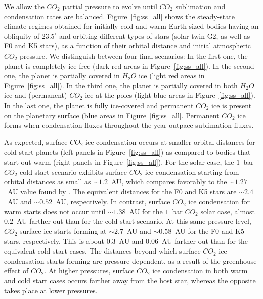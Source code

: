 \documentclass[fleqn,usenatbib]{mnras}
\begin{document}
We allow the $CO_{\mathrm{2}}$ partial pressure to evolve until $CO_{\mathrm{2}}$ sublimation and condensation rates are balanced. Figure~\ref{fig:ss_all} shows the steady-state climate regimes obtained for initially cold and warm Earth-sized bodies having an obliquity of $23.5^{\circ}$ and orbiting different types of stars (solar twin-G2, as well as F0 and K5 stars), as a function of their orbital distance and initial atmospheric $CO_{\mathrm{2}}$ pressure.  We distinguish between four final scenarios: In the first one, the planet is completely ice-free (dark red areas in Figure~\ref{fig:ss_all}). In the second one, the planet is partially covered in $H_{\mathrm{2}}O$ ice (light red areas in Figure~\ref{fig:ss_all}). In the third one, the planet is partially covered in both $H_{\mathrm{2}}O$ ice and (permanent) $CO_{\mathrm{2}}$ ice at the poles (light blue areas in Figure~\ref{fig:ss_all}). In the last one, the planet is fully ice-covered and permanent $CO_{\mathrm{2}}$ ice is present on the planetary surface (blue areas in Figure~\ref{fig:ss_all}. Permanent $CO_{\mathrm{2}}$ ice forms when condensation fluxes throughout the year outpace sublimation fluxes. 

As expected, surface $CO_{\mathrm{2}}$ ice condensation occurs at smaller orbital distances for cold start planets (left panels in Figure~\ref{fig:ss_all}) as compared to bodies that start out warm (right panels in Figure~\ref{fig:ss_all}).
For the solar case, the $1$~bar $CO_{\mathrm{2}}$ cold start scenario exhibits surface $CO_{\mathrm{2}}$ ice condensation starting from orbital distances as small as $\sim1.2$~AU, which compares favorably to the $\sim 1.27$~AU value found by \citet{Turbet2017}. The equivalent distances for the F0 and K5 stars are $\sim2.4$~AU and $\sim0.52$~AU, respectively.
In contrast, surface $CO_{\mathrm{2}}$ ice condensation for warm starts does not occur until $\sim1.38$~AU for the $1$~bar $CO_{\mathrm{2}}$ solar case, almost  $0.2$~AU farther out than for the cold start scenario. At this same pressure level, $CO_{\mathrm{2}}$ surface ice starts forming at $\sim2.7$~AU and $\sim0.58$~AU for the F0 and K5 stars, respectively. This is about $0.3$~AU and $0.06$~AU farther out than for the equivalent cold start cases.
The distances beyond which surface $CO_{\mathrm{2}}$ ice condensation starts forming are pressure-dependent, as a result of the greenhouse effect of $CO_{\mathrm{2}}$. At higher pressures, surface $CO_{\mathrm{2}}$ ice condensation in both warm and cold start cases occurs farther away from the host star, whereas the opposite takes place at lower pressures.
\end{document}
